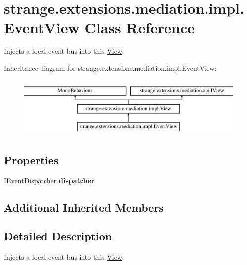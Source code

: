 \hypertarget{classstrange_1_1extensions_1_1mediation_1_1impl_1_1_event_view}{\section{strange.\-extensions.\-mediation.\-impl.\-Event\-View Class Reference}
\label{classstrange_1_1extensions_1_1mediation_1_1impl_1_1_event_view}
}


Injects a local event bus into this \hyperlink{classstrange_1_1extensions_1_1mediation_1_1impl_1_1_view}{View}.  


Inheritance diagram for strange.\-extensions.\-mediation.\-impl.\-Event\-View\-:\begin{figure}[H]
\begin{center}
\leavevmode
\includegraphics[height=3.000000cm]{classstrange_1_1extensions_1_1mediation_1_1impl_1_1_event_view}
\end{center}
\end{figure}
\subsection*{Properties}
\begin{DoxyCompactItemize}
\item 
\hypertarget{classstrange_1_1extensions_1_1mediation_1_1impl_1_1_event_view_a88fade627a5247ae8e05bf1a58d95bc9}{\hyperlink{interfacestrange_1_1extensions_1_1dispatcher_1_1eventdispatcher_1_1api_1_1_i_event_dispatcher}{I\-Event\-Dispatcher} {\bfseries dispatcher}}\label{classstrange_1_1extensions_1_1mediation_1_1impl_1_1_event_view_a88fade627a5247ae8e05bf1a58d95bc9}

\end{DoxyCompactItemize}
\subsection*{Additional Inherited Members}


\subsection{Detailed Description}
Injects a local event bus into this \hyperlink{classstrange_1_1extensions_1_1mediation_1_1impl_1_1_view}{View}. 

